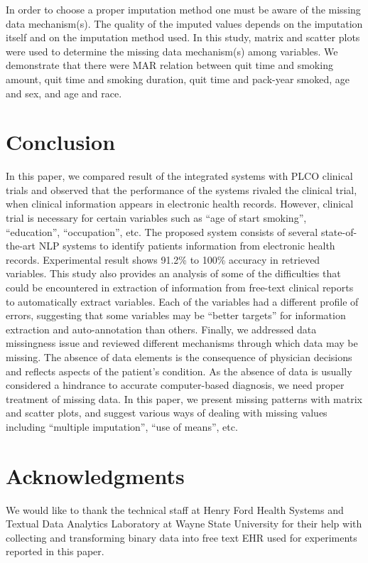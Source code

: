 \documentclass{amia}
\begin{document}
In order to choose a proper imputation method one must be aware of the missing data mechanism(s). The quality of the imputed values depends on the imputation itself and on the imputation method used. In this study, matrix and scatter plots were used to determine the missing data mechanism(s) among variables. We demonstrate that there were MAR relation between quit time and smoking amount, quit time and smoking duration, quit time and pack-year smoked, age and sex, and age and race.

\section*{Conclusion}
In this paper, we compared result of the integrated systems with PLCO clinical trials and observed that the performance of the systems rivaled the clinical trial, when clinical information appears in electronic health records. However, clinical trial is necessary for certain variables such as ``age of start smoking'', ``education'', ``occupation'', etc. The proposed system consists of several state-of-the-art NLP systems to identify patients information from electronic health records. Experimental result shows 91.2\% to 100\% accuracy in retrieved variables. This study also provides an analysis of some of the
difficulties that could be encountered in extraction of information from free-text clinical reports to automatically extract variables. Each of the
variables had a different profile of errors, suggesting that some variables may be ``better targets'' for information extraction and auto-annotation than others. Finally, we addressed data missingness issue and reviewed different mechanisms through which data may be missing. The absence of data elements is the consequence of physician decisions and reflects aspects of the patient's condition. As the absence of data is usually considered a hindrance to accurate computer-based diagnosis, we need proper treatment of missing data. In this paper, we present missing patterns with matrix and scatter plots, and suggest various ways of dealing with missing values including ``multiple imputation'', ``use of means'', etc.  

\section*{Acknowledgments}
We would like to thank the technical staff at Henry Ford Health Systems and Textual Data Analytics Laboratory at Wayne State University for their help with collecting and transforming binary data into free text EHR used for experiments reported in this paper. 



\end{document}
